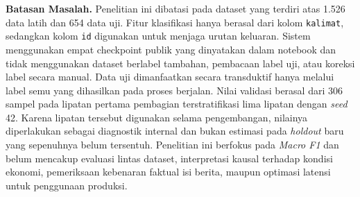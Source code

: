 \textbf{Batasan Masalah.} Penelitian ini dibatasi pada dataset yang terdiri atas 1.526 data latih dan 654 data uji. Fitur klasifikasi hanya berasal dari kolom \texttt{kalimat}, sedangkan kolom \texttt{id} digunakan untuk menjaga urutan keluaran. Sistem menggunakan empat checkpoint publik yang dinyatakan dalam notebook dan tidak menggunakan dataset berlabel tambahan, pembacaan label uji, atau koreksi label secara manual. Data uji dimanfaatkan secara transduktif hanya melalui label semu yang dihasilkan pada proses berjalan. Nilai validasi berasal dari 306 sampel pada lipatan pertama pembagian terstratifikasi lima lipatan dengan \textit{seed} 42. Karena lipatan tersebut digunakan selama pengembangan, nilainya diperlakukan sebagai diagnostik internal dan bukan estimasi pada \textit{holdout} baru yang sepenuhnya belum tersentuh. Penelitian ini berfokus pada \textit{Macro F1} dan belum mencakup evaluasi lintas dataset, interpretasi kausal terhadap kondisi ekonomi, pemeriksaan kebenaran faktual isi berita, maupun optimasi latensi untuk penggunaan produksi.
